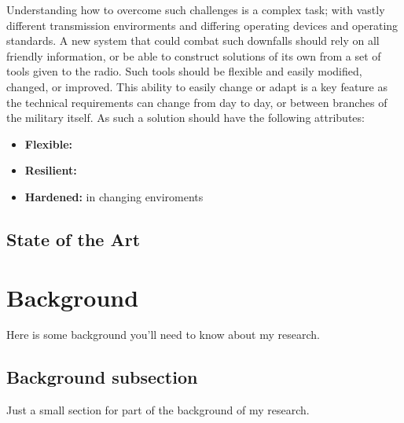 \documentclass[11pt]{mvlthesis}
\begin{document}
Understanding how to overcome such challenges is a complex task; with vastly different transmission envirorments and differing operating devices and operating standards.  A new system that could combat such downfalls should rely on all friendly information, or be able to construct solutions of its own from a set of tools given to the radio.  Such tools should be flexible and easily modified, changed, or improved.  This ability to easily change or adapt is a key feature as the technical requirements can change from day to day, or between branches of the military itself. As such a solution should have the following attributes:
\begin{itemize}
\item \textbf{Flexible:}

\item \textbf{Resilient:}

\item \textbf{Hardened:} in changing enviroments

\end{itemize}


\section{State of the Art}


\chapter{Background}
\label{ch:background}

Here is some background you'll need to know about my research.

\section{Background subsection}

Just a small section for part of the background of my research. \cite{bibtexcite}









%


\end{document}
